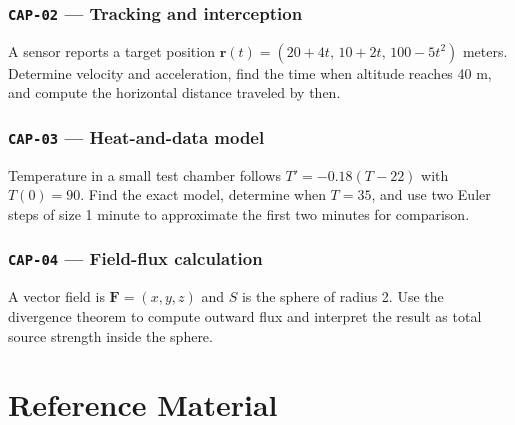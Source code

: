 \documentclass[11pt]{book}
\newcommand{\pid}[1]{\texttt{#1}}
\newcommand{\workspace}{\par\vspace{0.7in}\hrulefill\par\vspace{0.55in}\hrulefill\par}
\begin{document}
\section*{\pid{CAP-02} — Tracking and interception}
\begin{problembox}A sensor reports a target position $\mathbf r(t)=(20+4t,\,10+2t,\,100-5t^2)$ meters. Determine velocity and acceleration, find the time when altitude reaches 40 m, and compute the horizontal distance traveled by then.\end{problembox}
\workspace\workspace
\section*{\pid{CAP-03} — Heat-and-data model}
\begin{problembox}Temperature in a small test chamber follows $T'= -0.18(T-22)$ with $T(0)=90$. Find the exact model, determine when $T=35$, and use two Euler steps of size 1 minute to approximate the first two minutes for comparison.\end{problembox}
\workspace\workspace
\section*{\pid{CAP-04} — Field-flux calculation}
\begin{problembox}A vector field is $\mathbf F=(x,y,z)$ and $S$ is the sphere of radius 2. Use the divergence theorem to compute outward flux and interpret the result as total source strength inside the sphere.\end{problembox}
\workspace\workspace
\part{Reference Material}
\end{document}
